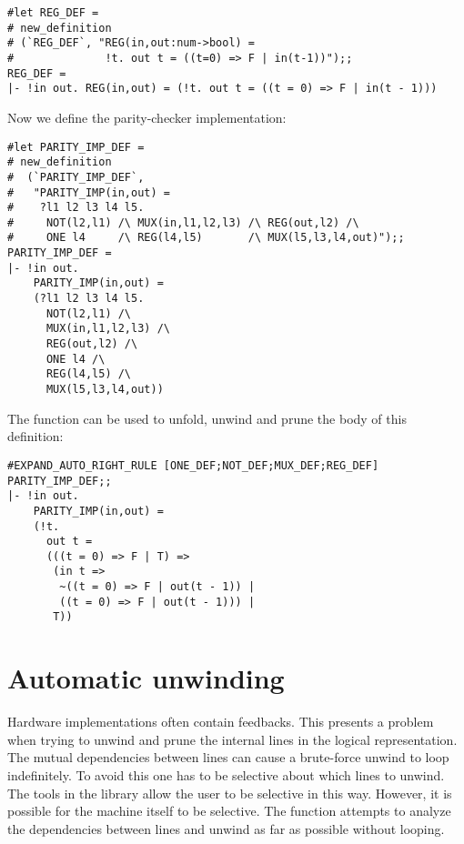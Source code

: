 \begin{session}\begin{verbatim}
#let REG_DEF =
# new_definition
# (`REG_DEF`, "REG(in,out:num->bool) =
#              !t. out t = ((t=0) => F | in(t-1))");;
REG_DEF = 
|- !in out. REG(in,out) = (!t. out t = ((t = 0) => F | in(t - 1)))
\end{verbatim}\end{session}

\vfill

\noindent
Now we define the parity-checker implementation:

\begin{session}\begin{verbatim}
#let PARITY_IMP_DEF =
# new_definition
#  (`PARITY_IMP_DEF`,
#   "PARITY_IMP(in,out) =
#    ?l1 l2 l3 l4 l5.
#     NOT(l2,l1) /\ MUX(in,l1,l2,l3) /\ REG(out,l2) /\
#     ONE l4     /\ REG(l4,l5)       /\ MUX(l5,l3,l4,out)");;
PARITY_IMP_DEF = 
|- !in out.
    PARITY_IMP(in,out) =
    (?l1 l2 l3 l4 l5.
      NOT(l2,l1) /\
      MUX(in,l1,l2,l3) /\
      REG(out,l2) /\
      ONE l4 /\
      REG(l4,l5) /\
      MUX(l5,l3,l4,out))
\end{verbatim}\end{session}

\noindent
The function  can be used to unfold, unwind and
prune the body of this definition:

\begin{session}\begin{verbatim}
#EXPAND_AUTO_RIGHT_RULE [ONE_DEF;NOT_DEF;MUX_DEF;REG_DEF] PARITY_IMP_DEF;;
|- !in out.
    PARITY_IMP(in,out) =
    (!t.
      out t =
      (((t = 0) => F | T) => 
       (in t => 
        ~((t = 0) => F | out(t - 1)) | 
        ((t = 0) => F | out(t - 1))) | 
       T))
\end{verbatim}\end{session}


\section{Automatic unwinding}

\def\putbox(#1,#2){\put(#1,#2){\framebox(2,2){}}}

Hardware implementations often contain feedbacks. This presents a problem
when trying to unwind and prune the internal lines in the logical
representation. The mutual dependencies between lines can cause a brute-force
unwind to loop indefinitely. To avoid this one has to be selective about
which lines to unwind. The tools in the  library allow the user
to be selective in this way. However, it is possible for the machine itself to
be selective. The function \ml{UNWIND\_AUTO\_CONV} attempts to analyze the
dependencies between lines and unwind as far as possible without looping.


